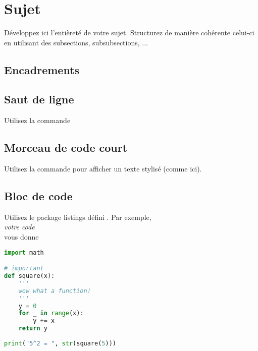 \section{Sujet}
Développez ici l'entièreté de votre sujet.
Structurez de manière cohérente celui-ci en utilisant des subsections, subsubsections, ...

\subsection{Encadrements}




\subsection{Saut de ligne}

Utilisez la commande 

\subsection{Morceau de code court}

Utilisez la commande  pour afficher un texte stylisé (comme ici).

\subsection{Bloc de code}

Utilisez le package listings défini .
Par exemple,\\
 \hspace{6pt}
\textit{votre code} \hspace{6pt}
\\
vous donne

\begin{lstlisting}[language=python, title={Exemple de bloc de code}]
import math

# important
def square(x):
	'''
	wow what a function!
	'''
	y = 0
	for _ in range(x):
		y += x
	return y
	
print("5^2 = ", str(square(5)))
\end{lstlisting}

